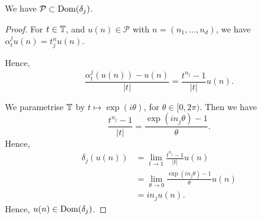\begin{lemma}
    We have $\mathcal{P} \subset \operatorname{Dom}(\delta_j)$.
\end{lemma}
\begin{proof}
    For $t \in \mathbb{T}$, and $u(n) \in \mathcal{P}$ with $n = (n_1,\ldots,n_d)$, we have $\alpha^j_tu(n) = t^n_ju(n)$.
    
    Hence,
    \begin{equation}
        \frac{\alpha^j_t(u(n))-u(n)}{|t|} = \frac{t^{n_j}-1}{|t|}u(n).
    \end{equation}
    
    We parametrise $\mathbb{T}$ by $t\mapsto \exp( i \theta)$, for $\theta \in [0,2\pi)$. Then we
    have
    \begin{equation}
        \frac{t^{n_j}-1}{|t|} = \frac{\exp(in_j\theta)-1}{\theta}.
    \end{equation}
    Hence,
    \begin{align}
        \delta_j(u(n)) &= \lim_{t\rightarrow 1} \frac{t^{n_j}-1}{|t|}u(n)\\
                &= \lim_{\theta\rightarrow 0} \frac{\exp(in_j\theta)-1}{\theta}u(n)\\
                &= in_ju(n).
    \end{align}
    Hence, $u(n) \in \operatorname{Dom}(\delta_j)$.
\end{proof}


